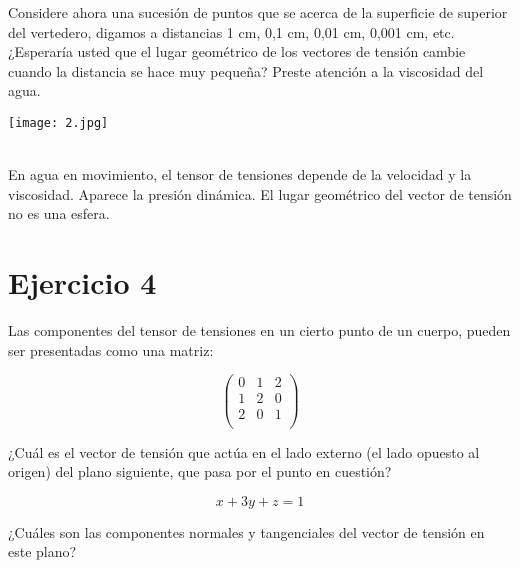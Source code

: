 \documentclass[a4paper,12pt,twoside,final,spanish]{article}
\begin{document}
Considere ahora una sucesión de puntos que se acerca de la superficie de superior del 
vertedero, digamos a distancias 1 cm, 0,1 cm, 0,01 cm, 0,001 cm,  etc. ¿Esperaría 
usted que el lugar geométrico de los vectores de tensión cambie cuando la distancia se 
hace muy pequeña? Preste atención a la viscosidad del agua.

\begin{center}
\texttt{[image: 2.jpg]}
\end{center}

\dotfill \\

En agua en movimiento, el tensor de tensiones depende de la velocidad y la viscosidad. Aparece la presión dinámica. El lugar geométrico del vector de tensión no es una esfera.

\section*{Ejercicio 4}

Las componentes del tensor de tensiones en un cierto punto de un cuerpo, pueden ser 
presentadas como una matriz: 

\[
\left(\begin{matrix}
0 & 1 & 2\\
1 & 2 & 0\\
2 & 0 & 1\\
\end{matrix}\right)
\]

¿Cuál es el vector de tensión que actúa en el lado externo (el lado opuesto al origen) 
del plano siguiente, que pasa por el punto en cuestión? 

\[x+3y+z=1\]

¿Cuáles son las componentes normales y tangenciales del vector de tensión en este 
plano? 

\dotfill
\end{document}
